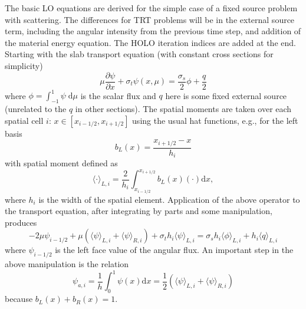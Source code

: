 \documentclass{mc2013}
\newcommand{\pderiv}[2]{\frac{\partial #1}{\partial #2}}
\renewcommand{\d}{\mathrm{d}}
\newcommand{\mom}[1]{\langle #1 \rangle}
\newcommand{\xr}{{x_{i+1/2}}}
\begin{document}

    
\clearpage

\appendix

\label{sec:lo}
The basic LO equations are derived for the simple case of a fixed source problem with
scattering.  The differences for TRT problems will be in the external source term,
including the angular intensity from the previous time step, and addition of the material energy
equation. The HOLO iteration indices are added at the end. Starting with the slab transport equation (with constant cross sections
for simplicity)
\begin{equation}
\mu \pderiv{\psi}{x} + \sigma_t \psi(x,\mu) = \frac{\sigma_s}{2} \phi + \frac{q}{2}
\end{equation}
where $\phi=\int_{-1}^1 \psi \;\d \mu$ is the scalar flux and $q$ here is some fixed
external source (unrelated to the $q$ in other sections).  The spatial moments are
taken over each spatial cell $i$: $x\in[x_{i-1/2},x_{i+1/2}]$ using the usual hat
functions, e.g., for the left basis
\begin{equation}
b_L(x) = \frac{x_{i+1/2} - x}{h_i}
\end{equation}
with spatial moment defined as
\begin{equation}
\mom{\cdot}_{L,i} = \frac{2}{h_i} \int_{x_{i-1/2}}^{\xr} b_L(x) (\cdot) \d x,
\end{equation}
where $h_i$ is the width of the spatial element.
Application of the above operator to the transport equation, after integrating by parts and some manipulation, produces
\begin{equation}\label{left}
-2\mu \psi_{i-1/2} + \mu \left( \mom{\psi}_{L,i} + \mom\psi_{R,i} \right) + \sigma_t h_i \mom{\psi}_{L,i} = \sigma_s h_i \mom{\phi}_{L,i} + h_i \mom{q}_{L,i}
\end{equation}
where $\psi_{i-1/2}$ is the left face value of the angular flux. An important step in the above manipulation is the relation
\begin{equation}
\psi_{a,i} = \frac{1}{h}\int_0^1 \psi(x) \d x = \frac{1}{2} \left(\mom{\psi}_{L,i} + \mom{\psi}_{R,i} \right) 
\end{equation}
because $b_L(x) + b_R(x) =1 $.  
\end{document}
